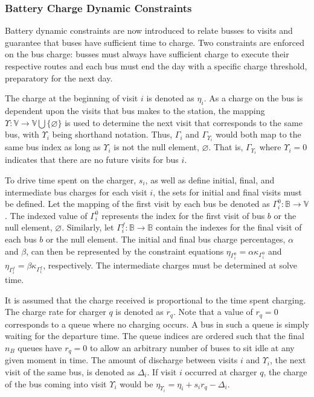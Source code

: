 \documentclass[ee,msthesis]{usuthesis}
\begin{document}
\subsubsection{Battery Charge Dynamic Constraints}
\label{sec:batt_dynamics}
Battery dynamic constraints are now introduced to relate busses to visits and guarantee that buses have sufficient time
to charge. Two constraints are enforced on the bus charge: busses must always have sufficient charge to execute their
respective routes and each bus must end the day with a specific charge threshold, preparatory for the next day.

The charge at the beginning of visit \(i\) is denoted as \(\eta_i\). As a charge on the bus is dependent upon the visits that
bus makes to the station, the mapping \(\Upsilon: \mathbb{V} \rightarrow \mathbb{V} \bigcup \{\varnothing\}\) is used to determine the next visit
that corresponds to the same bus, with \(\Upsilon_i\) being shorthand notation. Thus, \(\Gamma_i\) and \(\Gamma_{\Upsilon_i}\) would both map to the
same bus index as long as \(\Upsilon_i\) is not the null element, \(\varnothing\). That is, \(\Gamma_{\Upsilon_i}\) where \(\Upsilon_i = 0\) indicates
that there are no future visits for bus \(i\).

To drive time spent on the charger, \(s_i\), as well as define initial, final, and intermediate bus charges for each visit
\(i\), the sets for initial and final visits must be defined. Let the mapping of the first visit by each bus be denoted as
\(\Gamma^0_i : \mathbb{B} \rightarrow \mathbb{V}\). The indexed value of \(\Gamma^0_i\) represents the index for the first visit of bus \(b\) or
the null element, \(\varnothing\). Similarly, let \(\Gamma^f_i : \mathbb{B} \rightarrow \mathbb{B}\) contain the indexes for the final
visit of each bus \(b\) or the null element. The initial and final bus charge percentages, \(\alpha\) and \(\beta\), can then be
represented by the constraint equations \(\eta_{\Gamma^0_i} = \alpha \kappa_{\Gamma^0_i}\) and \(\eta_{\Gamma^f_i} = \beta \kappa_{\Gamma^f_i}\), respectively. The
intermediate charges must be determined at solve time.

It is assumed that the charge received is proportional to the time spent charging. The charge rate for charger \(q\) is
denoted as \(r_q\). Note that a value of \(r_q = 0\) corresponds to a queue where no charging occurs. A bus in such a queue
is simply waiting for the departure time. The queue indices are ordered such that the final \(n_B\) queues have \(r_q = 0\)
to allow an arbitrary number of buses to sit idle at any given moment in time. The amount of discharge between visits
\(i\) and \(\Upsilon_i\), the next visit of the same bus, is denoted as \(\Delta_i\). If visit \(i\) occurred at charger \(q\), the charge of
the bus coming into visit \(\Upsilon_i\) would be \(\eta_{\Upsilon_i} = \eta_i + s_i r_q - \Delta_i\).
\end{document}
